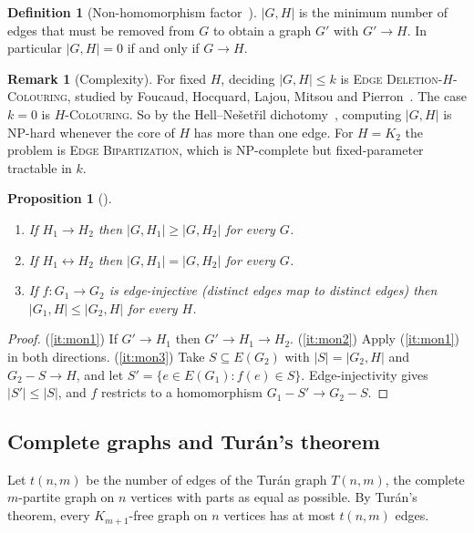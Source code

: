 \documentclass{article}
\newtheorem{proposition}[theorem]{Proposition}
\theoremstyle{definition}
\newtheorem{definition}[theorem]{Definition}
\newtheorem{remark}[theorem]{Remark}
\begin{document}
\begin{definition}[Non-homomorphism factor~\cite{khoshkha2005}]
\label{def:nhf}
$|G,H|$ is the minimum number of edges that must be removed from $G$ to obtain a
graph $G'$ with $G'\to H$.  In particular $|G,H|=0$ if and only if $G\to H$.
\end{definition}

\begin{remark}[Complexity]
For fixed $H$, deciding $|G,H|\le k$ is \textsc{Edge Deletion-$H$-Colouring},
studied by Foucaud, Hocquard, Lajou, Mitsou and Pierron~\cite{foucaud2019}.  The
case $k=0$ is \textsc{$H$-Colouring}.  So by the Hell--Ne\v{s}et\v{r}il
dichotomy~\cite{hell2004}, computing $|G,H|$ is NP-hard whenever the core of $H$
has more than one edge.  For $H=K_2$ the problem is \textsc{Edge Bipartization},
which is NP-complete but fixed-parameter tractable in $k$.
\end{remark}

\begin{proposition}[\cite{khoshkha2005}]
\label{prop:monotone}
\begin{enumerate}
  \item\label{it:mon1} If $H_1\to H_2$ then $|G,H_1|\ge|G,H_2|$ for every $G$.
  \item\label{it:mon2} If $H_1\leftrightarrow H_2$ then $|G,H_1|=|G,H_2|$ for every $G$.
  \item\label{it:mon3} If $f\colon G_1\to G_2$ is edge-injective (distinct edges
        map to distinct edges) then $|G_1,H|\le|G_2,H|$ for every $H$.
\end{enumerate}
\end{proposition}

\begin{proof}
(\ref{it:mon1}) If $G'\to H_1$ then $G'\to H_1\to H_2$.
(\ref{it:mon2}) Apply (\ref{it:mon1}) in both directions.
(\ref{it:mon3}) Take $S\subseteq E(G_2)$ with $|S|=|G_2,H|$ and $G_2-S\to H$, and
let $S'=\{e\in E(G_1):f(e)\in S\}$.  Edge-injectivity gives $|S'|\le|S|$, and $f$
restricts to a homomorphism $G_1-S'\to G_2-S$.
\end{proof}

\subsection{Complete graphs and Tur\'an's theorem}

Let $t(n,m)$ be the number of edges of the Tur\'an graph $T(n,m)$, the complete
$m$-partite graph on $n$ vertices with parts as equal as possible.  By Tur\'an's
theorem, every $K_{m+1}$-free graph on $n$ vertices has at most $t(n,m)$ edges.
\end{document}

